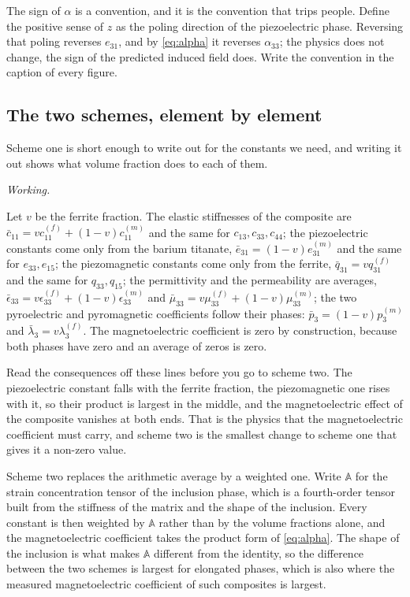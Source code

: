 \documentclass[11pt,a4paper]{article}
\newif\ifshowworked \showworkedtrue
\newenvironment{worked}{\ifshowworked\par\smallskip\noindent\textit{Working.}\par\else\setbox0\vbox\bgroup\fi}{\ifshowworked\par\smallskip\else\egroup\fi}
\newcommand{\aME}{\alpha}
\begin{document}
The sign of $\aME$ is a convention, and it is the convention that trips people. Define the positive sense of
$z$ as the poling direction of the piezoelectric phase. Reversing that poling reverses $e_{31}$, and by
\eqref{eq:alpha} it reverses $\aME_{33}$; the physics does not change, the sign of the predicted induced
field does. Write the convention in the caption of every figure.

\subsection{The two schemes, element by element}

Scheme one is short enough to write out for the constants we need, and writing it out shows what volume
fraction does to each of them.

\begin{worked}
Let $v$ be the ferrite fraction. The elastic stiffnesses of the composite are
$\bar c_{11}=v c^{(f)}_{11}+(1-v)c^{(m)}_{11}$ and the same for $c_{13},c_{33},c_{44}$; the piezoelectric
constants come only from the barium titanate, $\bar e_{31}=(1-v)e^{(m)}_{31}$ and the same for $e_{33},e_{15}$;
the piezomagnetic constants come only from the ferrite, $\bar q_{31}=vq^{(f)}_{31}$ and the same for
$q_{33},q_{15}$; the permittivity and the permeability are averages,
$\bar\epsilon_{33}=v\epsilon^{(f)}_{33}+(1-v)\epsilon^{(m)}_{33}$ and
$\bar\mu_{33}=v\mu^{(f)}_{33}+(1-v)\mu^{(m)}_{33}$; the two pyroelectric and pyromagnetic coefficients follow
their phases: $\bar p_3=(1-v)p^{(m)}_3$ and $\bar\lambda_3=v\lambda^{(f)}_3$. The magnetoelectric coefficient
is zero by construction, because both phases have zero and an average of zeros is zero.
\end{worked}

\noindent Read the consequences off these lines before you go to scheme two. The piezoelectric constant falls
with the ferrite fraction, the piezomagnetic one rises with it, so their product is largest in the middle,
and the magnetoelectric effect of the composite vanishes at both ends. That is the physics that the
magnetoelectric coefficient must carry, and scheme two is the smallest change to scheme one that gives it a
non-zero value.

Scheme two replaces the arithmetic average by a weighted one. Write $\mathbb A$ for the strain concentration
tensor of the inclusion phase, which is a fourth-order tensor built from the stiffness of the matrix and the
shape of the inclusion. Every constant is then weighted by $\mathbb A$ rather than by the volume fractions
alone, and the magnetoelectric coefficient takes the product form of \eqref{eq:alpha}. The shape of the
inclusion is what makes $\mathbb A$ different from the identity, so the difference between the two schemes is
largest for elongated phases, which is also where the measured magnetoelectric coefficient of such composites
is largest.
\end{document}
